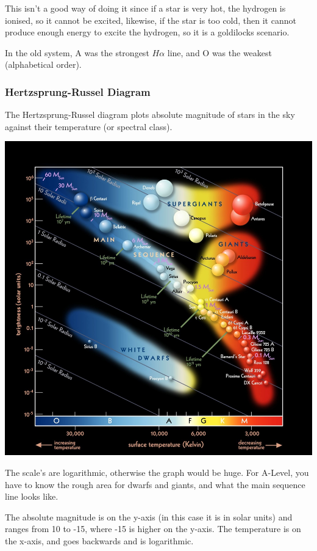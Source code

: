 \documentclass[a4paper, 12pt]{article}
\begin{document}
This isn't a good way of doing it since if a star is very hot, the hydrogen is ionised, so it cannot be excited, likewise, if the star is too cold, then it cannot produce enough energy to excite the hydrogen, so it is a goldilocks scenario.

In the old system, A was the strongest $H \alpha$ line, and O was the weakest (alphabetical order).

\subsubsection{Hertzsprung-Russel Diagram}

The Hertzsprung-Russel diagram plots absolute magnitude of stars in the sky against their temperature (or spectral class).

\includegraphics[width=\textwidth]{images/hertzsprungRussel.jpg}

The scale's are logarithmic, otherwise the graph would be huge. For A-Level, you have to know the rough area for dwarfs and giants, and what the main sequence line looks like.

The absolute magnitude is on the y-axis (in this case it is in solar units) and ranges from 10 to -15, where -15 is higher on the y-axis. The temperature is on the x-axis, and goes backwards and is logarithmic.
\end{document}
